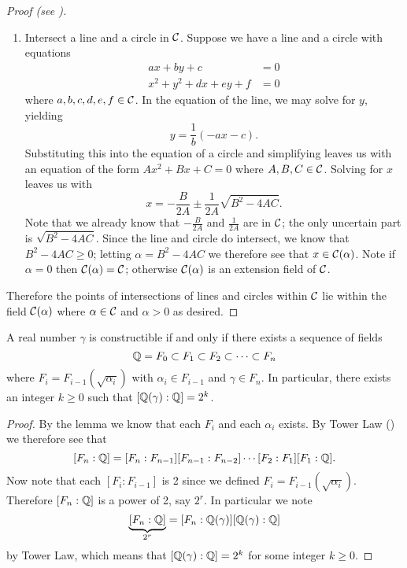 \begin{proof}[Proof (see {\cite[pp.~272-273]{judson_beezer_2022}})]
\begin{enumerate}
        \item Intersect a line and a circle in $\mathcal{C}$. Suppose we have a line and a circle with equations
        \begin{align*}
            ax + by + c &= 0\\
            x^2 + y^2 + dx + ey + f &= 0
        \end{align*}
        where $a,b,c,d,e,f \in \mathcal{C}$. In the equation of the line, we may solve for $y$, yielding
        \[
            y = \frac1b (-ax - c).    
        \]
        Substituting this into the equation of a circle and simplifying leaves us with an equation of the form $Ax^2 + Bx + C = 0$ where $A,B,C\in\mathcal{C}$. Solving for $x$ leaves us with
        \[
            x = -\frac{B}{2A} \pm \frac{1}{2A}\sqrt{B^2-4AC}.
        \]
        Note that we already know that $-\frac{B}{2A}$ and $\frac{1}{2A}$ are in $\mathcal{C}$; the only uncertain part is $\sqrt{B^2-4AC}$. Since the line and circle do intersect, we know that $B^2-4AC \geq 0$; letting $\alpha = B^2 - 4AC$ we therefore see that $x \in \mathcal{C}(\alpha)$. Note if $\alpha = 0$ then $\mathcal{C}(\alpha) = \mathcal{C}$; otherwise $\mathcal{C}(\alpha)$ is an extension field of $\mathcal{C}$.
    \end{enumerate}
    Therefore the points of intersections of lines and circles within $\mathcal{C}$ lie within the field $\mathcal{C}(\alpha)$ where $\alpha \in \mathcal{C}$ and $\alpha > 0$ as desired.
\end{proof}

\begin{theorem}\label{thrm-condition-for-constructability}
    A real number $\gamma$ is constructible if and only if there exists a sequence of fields
    \[
        \mathbb{Q} = F_0 \subset F_1 \subset F_2 \subset \cdots \subset F_n
    \]
    where $F_i = F_{i-1}(\sqrt{\alpha_i})$ with $\alpha_i \in F_{i-1}$ and $\gamma \in F_n$. In particular, there exists an integer $k \geq 0$ such that $[\mathbb{Q}(\gamma):\mathbb{Q}] = 2^k$.
\end{theorem}
\begin{proof}
    By the lemma we know that each $F_i$ and each $\alpha_i$ exists. By Tower Law () we therefore see that
    \[
        [F_n:\mathbb{Q}] = [F_n:F_{n-1}][F_{n-1}:F_{n-2}]\cdots[F_2:F_1][F_1:\mathbb{Q}].
    \]
    Now note that each $[F_i:F_{i-1}]$ is 2 since we defined $F_i = F_{i-1}(\sqrt{\alpha_i})$. Therefore $[F_n:\mathbb{Q}]$ is a power of 2, say $2^r$. In particular we note
    \[
        \underbrace{[F_n:\mathbb{Q}]}_{2^r} = [F_n:\mathbb{Q}(\gamma)][\mathbb{Q}(\gamma):\mathbb{Q}]
    \]
    by Tower Law, which means that $[\mathbb{Q}(\gamma):\mathbb{Q}] = 2^k$ for some integer $k \geq 0$.
\end{proof}


